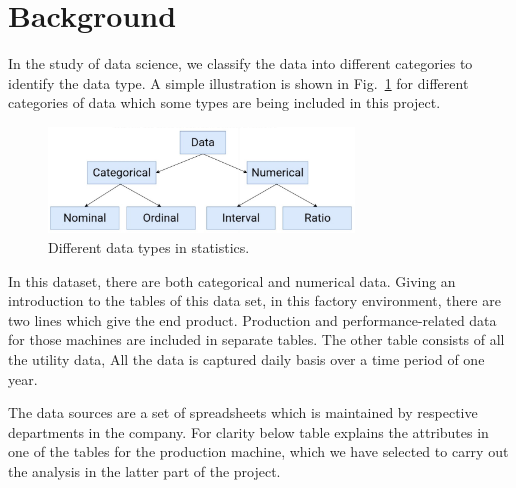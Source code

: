 \section{Background}
In the study of data science, we classify the data into different categories to identify the data type. A simple illustration is shown in Fig.~\ref{type_of_features} for different categories of data which some types are being included in this project.

\begin{figure}
  \begin{center}
  \includegraphics[width=3.2in]{photo/type_of_features.png}
  \caption{Different data types in statistics.}\label{type_of_features}
  \end{center}
\end{figure}

In this dataset, there are both categorical and numerical data. Giving an introduction to the tables of this data set, in this factory environment, there are two lines which give the end product. Production and performance-related data for those machines are included in separate tables. The other table consists of all the utility data, All the data is captured daily basis over a time period of one year.

The data sources are a set of spreadsheets which is maintained by respective departments in the company. For clarity below table explains the attributes in one of the tables for the production machine, which we have selected to carry out the analysis in the latter part of the project. \\


